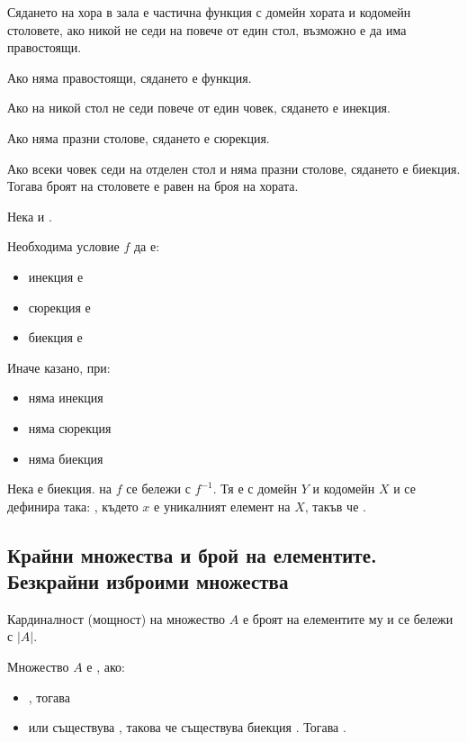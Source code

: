 \begin{example}
    Сядането на хора в зала е частична функция с домейн хората и кодомейн столовете, ако никой не седи на 
    повече от един стол, възможно е да има правостоящи.
    
    Ако няма правостоящи, сядането е функция.

    Ако на никой стол не седи повече от един човек, сядането е инекция.

    Ако няма празни столове, сядането е сюрекция.

    Ако всеки човек седи на отделен стол и няма празни столове, сядането е биекция. Тогава броят на 
    столовете е равен на броя на хората.
\end{example}

Нека  и .

Необходима условие \(f\) да е:
\begin{itemize}
    \item инекция е 
    \item сюрекция е 
    \item биекция е 
\end{itemize}

Иначе казано, при:
\begin{itemize}
    \item {} няма инекция
    \item {} няма сюрекция
    \item {} няма биекция
\end{itemize}

\begin{definition}
    Нека  е биекция.
     на \(f\) се бележи с \(f^{-1}\). Тя е с домейн \(Y\) и кодомейн \(X\) и се 
    дефинира така: , където \(x\) е уникалният елемент на \(X\), такъв
    че .
\end{definition}

\subsection{Крайни множества и брой на елементите. Безкрайни изброими множества}
Кардиналност (мощност) на множество \(A\) е броят на елементите му и се бележи с \(|A|\).

\begin{definition} 
    Множество \(A\) е , ако:
    \begin{itemize}
        \item {}, тогава 
        \item или съществува , такова че съществува биекция
        . Тогава .
    \end{itemize}
\end{definition}

